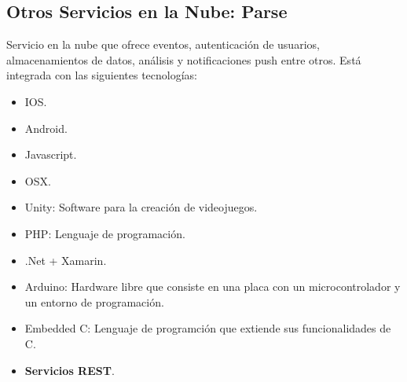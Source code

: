 	\subsection{Otros Servicios en la Nube: Parse\cite{16:parse:online}}
	Servicio en la nube que ofrece eventos, autenticación de usuarios, almacenamientos de datos, análisis y notificaciones push entre otros.
	Está integrada con las siguientes tecnologías:
	\begin{itemize}
		\item IOS\cite{10:ios:online}.
		\item Android\cite{2:android:online}.
		\item Javascript\cite{22:javascript:online}.
		\item OSX\cite{23:osx:online}.
		\item Unity\cite{24:unity:online}: Software para la creación de videojuegos.
		\item PHP\cite{25:php:online}: Lenguaje de programación.
		\item .Net + Xamarin.
		\item Arduino\cite{26:arduino:online}: Hardware libre que consiste en una placa con un microcontrolador y un entorno de programación.
		\item Embedded C\cite{27:embeddedC:online}: Lenguaje de programción que extiende sus funcionalidades de C\cite{28:c:online}.
		\item {\bf Servicios REST}\cite{11:rest:online}.
	\end{itemize}
	
